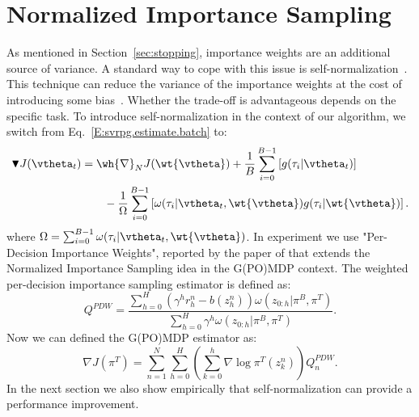 \section{Normalized Importance Sampling}\label{sec:prac}
\vspace{-0.05in}
As mentioned in Section~\ref{sec:stopping}, importance weights are an additional source of variance. A standard way to cope with this issue is self-normalization~\citep[\eg][]{precup2000eligibility,owenmcbook}.
This technique can reduce the variance of the importance weights at the cost of introducing some bias~\citep[][Chapter 9]{owenmcbook}.
Whether the trade-off is advantageous depends on the specific task.  
To introduce self-normalization in the context of our algorithm, we switch from Eq.~\eqref{E:svrpg.estimate.batch} to:
\begin{align*}
\blacktriangledown J(\vtheta_{t}) &= \wh{\nabla}_N J(\wt{\vtheta}) + \frac{1}{B} \sum_{i=0}^{B-1} \left[g(\tau_i|\vtheta_t)\right]\\ 
&\qquad{} - \frac{1}{\Omega} \sum_{i=0}^{B-1} \left[ \omega(\tau_i|\vtheta_t, \wt{\vtheta}) g(\tau_i|\wt{\vtheta})
\right].
\end{align*}
where $\Omega = \sum_{i=0}^{B-1}\omega(\tau_i|\vtheta_t, \wt{\vtheta})$.
\newline
In experiment we use "Per-Decision Importance Weights", reported by the paper of \cite[\eg][]{precup2000eligibility} that extends the Normalized Importance Sampling idea in the G(PO)MDP context. 
The weighted per-decision importance sampling estimator is defined as:
\[
Q^{PDW} = \frac{\sum_{h=0}^H  \left(\gamma^h r_h^n - b(z_h^n)\right) \omega(z_{0:h}|\pi^B,\pi^T)}{\sum_{h=0}^H \gamma^h \omega(z_{0:h}|\pi^B,\pi^T)}.
\]
Now we can defined the G(PO)MDP estimator as:
\[
\nabla J(\pi^T) = \sum_{n=1}^{N}
	\sum_{h=0}^H \left(\sum_{k=0}^h \nabla \log\pi^T(z_k^n)\right) Q^{PDW}_n .
\]
\newline
In the next section we also show empirically that self-normalization can provide a performance improvement.


\vspace{-0.05in}
